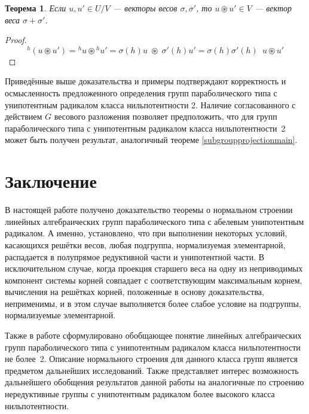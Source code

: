 \documentclass[12pt]{matmex-diploma}
\theoremstyle{mystyleni}
\theoremstyle{mystyle}
\newtheorem{thm}{Теорема}
\newcommand\refb[1]{\ref{#1}}
\begin{document}
\begin{thm}
Если $u,u' \in U\!/V$ --- векторы весов $\sigma, \sigma'$, то $u \circledast u' \in V$ --- вектор веса $\sigma + \sigma'$.
\end{thm}
\begin{proof}
$$
{}^h(u \circledast u') = {}^h u  \circledast {}^h u' = \sigma(h) u \; \circledast \; \sigma'(h) u' = \sigma(h)\sigma'(h) \enspace u \circledast u'
$$
\end{proof}


Приведённые выше доказательства  и примеры подтверждают корректность и осмысленность предложенного определения групп параболического типа с унипотентным радикалом класса нильпотентности 2.
Наличие согласованного с действием $G$ весового разложения позволяет предположить, что для групп параболического типа с унипотентным радикалом класса нильпотентности~2 может быть получен результат, аналогичный теореме \refb{subgroupprojectionmain}.

\section{Заключение}

В настоящей работе получено доказательство теоремы о нормальном строении линейных алгебраических групп параболического типа с абелевым унипотентным радикалом.
А именно, установлено, что при выполнении некоторых условий, касающихся решётки весов, любая подгруппа, нормализуемая элементарной, распадается в полупрямое редуктивной части и унипотентной части. В исключительном случае, когда проекция старшего веса на одну из неприводимых компонент системы корней совпадает с соответствующим максимальным корнем, вычисления на решётках корней, положенные в основу доказательства, неприменимы, и в этом случае выполняется более слабое условие на подгруппы, нормализуемые элементарной.

Также в работе сформулировано обобщающее понятие линейных алгебраических групп параболического типа с унипотентным радикалом класса нильпотентности не более~2. Описание нормального строения для данного класса групп является предметом дальнейших исследований.
Также представляет интерес возможность дальнейшего обобщения результатов данной работы на аналогичные по строению нередуктивные группы с унипотентным радикалом более высокого класса нильпотентности.



\end{document}
